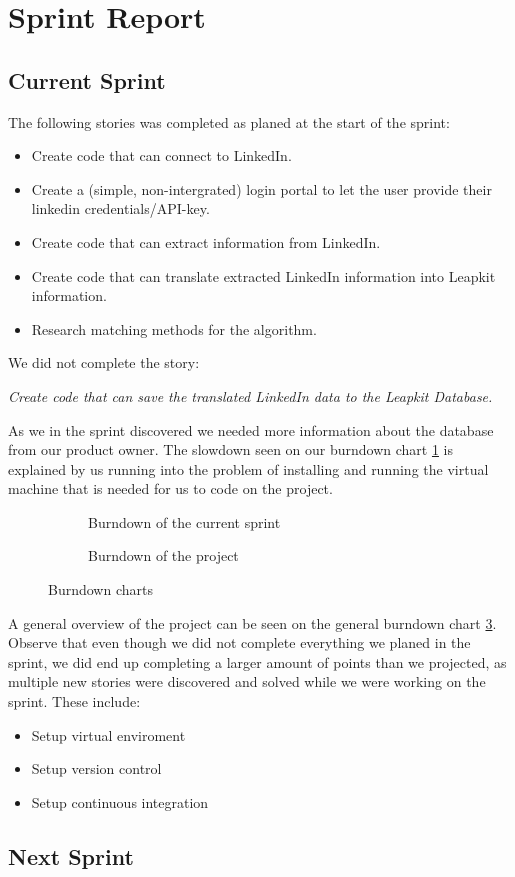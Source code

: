 \newpage
\section{Sprint Report}

\subsection{Current Sprint}

The following stories was completed as planed at the start of the sprint:
\begin{itemize}
    \item Create code that can connect to LinkedIn.
    \item Create a (simple, non-intergrated) login portal to let the user provide their linkedin credentials/API-key. 
    \item Create code that can extract information from LinkedIn.
    \item Create code that can translate extracted LinkedIn information into Leapkit information.
    \item Research matching methods for the algorithm.
\end{itemize}
We did not complete the story:
\begin{center}
    \emph{Create code that can save the translated LinkedIn data to the Leapkit Database.}
\end{center}
As we in the sprint discovered we needed more information about the database from our product owner.
The slowdown seen on our burndown chart \ref{fig:burndownSprint} is explained by us running into the problem
of installing and running the virtual machine that is needed for us to code on the project.\\
\begin{figure}[!ht]
    \centering
    \begin{subfigure}[b]{0.5\textwidth}
        \scalebox{.6}{}
        \caption{Burndown of the current sprint}
        \label{fig:burndownSprint}
    \end{subfigure}%
    \begin{subfigure}[b]{0.5\textwidth}
        \scalebox{.7}{}
        \caption{Burndown of the project}
        \label{fig:burndownProject}
    \end{subfigure}
    \caption{Burndown charts}
\end{figure}
A general overview of the project can be seen on the general burndown chart \ref{fig:burndownProject}.\\
Observe that even though we did not complete everything we planed in the sprint, we did end up completing a larger amount of points than we projected, as multiple new stories were discovered and solved while we were working on the sprint. These include:
\begin{itemize}
    \item Setup virtual enviroment 
    \item Setup version control
    \item Setup continuous integration
\end{itemize}

\subsection{Next Sprint}

